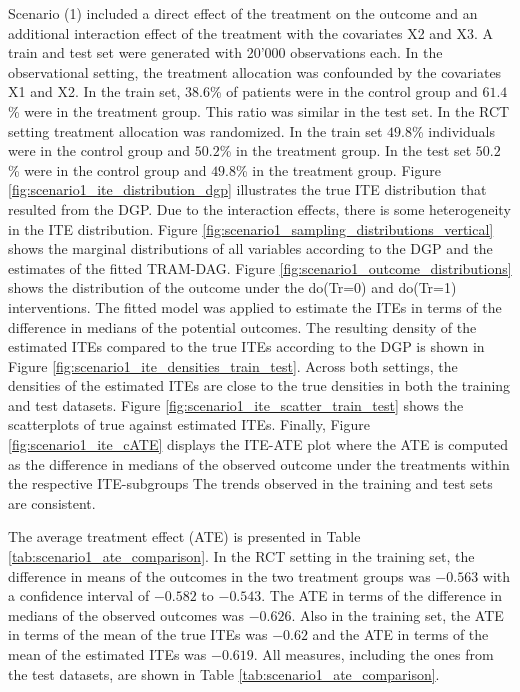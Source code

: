 Scenario (1) included a direct effect of the treatment on the outcome and an additional interaction effect of the treatment with the covariates X2 and X3. A train and test set were generated with 20'000 observations each. In the observational setting, the treatment allocation was confounded by the covariates X1 and X2.  In the train set, $38.6$\% of patients were in the control group and $61.4$\% were in the treatment group. This ratio was similar in the test set. In the RCT setting treatment allocation was randomized. In the train set $49.8$\% individuals were in the control group and $50.2$\% in the treatment group. In the test set $50.2$\% were in the control group and $49.8$\% in the treatment group. Figure \ref{fig:scenario1_ite_distribution_dgp} illustrates the true ITE distribution that resulted from the DGP. Due to the interaction effects, there is some heterogeneity in the ITE distribution. Figure \ref{fig:scenario1_sampling_distributions_vertical} shows the marginal distributions of all variables according to the DGP and the estimates of the fitted TRAM-DAG. Figure \ref{fig:scenario1_outcome_distributions} shows the distribution of the outcome under the do(Tr=0) and do(Tr=1) interventions. The fitted model was applied to estimate the ITEs in terms of the difference in medians of the potential outcomes. The resulting density of the estimated ITEs compared to the true ITEs according to the DGP is shown in Figure \ref{fig:scenario1_ite_densities_train_test}. Across both settings, the densities of the estimated ITEs are close to the true densities in both the training and test datasets. Figure \ref{fig:scenario1_ite_scatter_train_test} shows the scatterplots of true against estimated ITEs. Finally, Figure \ref{fig:scenario1_ite_cATE} displays the ITE-ATE plot where the ATE is computed as the difference in medians of the observed outcome under the treatments within the respective ITE-subgroups The trends observed in the training and test sets are consistent.

The average treatment effect (ATE) is presented in Table \ref{tab:scenario1_ate_comparison}. In the RCT setting in the training set, the difference in means of the outcomes in the two treatment groups was $-0.563$ with a confidence interval of $-0.582$ to $-0.543$. The ATE in terms of the difference in medians of the observed outcomes was $-0.626$. Also in the training set, the ATE in terms of the mean of the true ITEs was $-0.62$ and the ATE in terms of the mean of the estimated ITEs was $-0.619$. All measures, including the ones from the test datasets, are shown in Table \ref{tab:scenario1_ate_comparison}.

